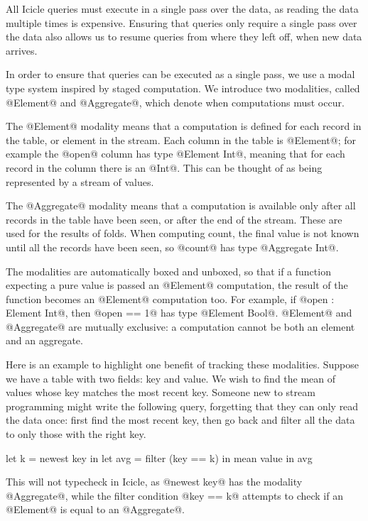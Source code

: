 All Icicle queries must execute in a single pass over the data, as reading the data multiple times is expensive. 
Ensuring that queries only require a single pass over the data also allows us to resume queries from where they left off, when new data arrives.

In order to ensure that queries can be executed as a single pass, we use a modal type system inspired by staged computation\cite{davies2001modal}.
We introduce two modalities, called @Element@ and @Aggregate@, which denote when computations must occur.

The @Element@ modality means that a computation is defined for each record in the table, or element in the stream.
Each column in the table is @Element@; for example the @open@ column has type @Element Int@, meaning that for each record in the column there is an @Int@.
This can be thought of as being represented by a stream of values.

The @Aggregate@ modality means that a computation is available only after all records in the table have been seen, or after the end of the stream.
These are used for the results of folds.
When computing count, the final value is not known until all the records have been seen, so @count@ has type @Aggregate Int@.

The modalities are automatically boxed and unboxed, so that if a function expecting a pure value is passed an @Element@ computation, the result of the function becomes an @Element@ computation too.
For example, if @open : Element Int@, then @open == 1@ has type @Element Bool@.
@Element@ and @Aggregate@ are mutually exclusive: a computation cannot be both an element and an aggregate.

Here is an example to highlight one benefit of tracking these modalities.
Suppose we have a table with two fields: key and value.
We wish to find the mean of values whose key matches the most recent key.
Someone new to stream programming might write the following query, forgetting that they can only read the data once: first find the most recent key, then go back and filter all the data to only those with the right key.

\begin{code}
   let k    = newest key
in let avg  = filter (key == k) in mean value
in avg
\end{code}

This will not typecheck in Icicle, as @newest key@ has the modality @Aggregate@, while the filter condition @key == k@ attempts to check if an @Element@ is equal to an @Aggregate@.


